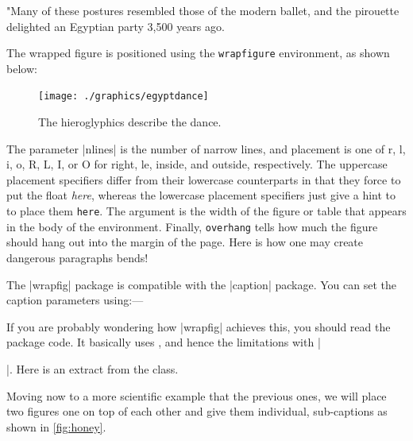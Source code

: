 \begin{dispListing}
"Many of these postures resembled those of the modern ballet, and the pirouette delighted an Egyptian party 3,500 years ago.
\medskip

The wrapped figure is positioned using the \texttt{wrapfigure} environment, as shown below:

\begin{teX}
\begin{figure}
   \texttt{[image: ./graphics/egyptdance]} 
   \caption{The hieroglyphics describe the dance.}
\end{figure}
\end{teX}

The parameter |nlines|  is the number of narrow lines, and placement is one of r, l, i, o, R, L, I, or
O for right, le, inside, and outside, respectively. The uppercase placement specifiers
differ from their lowercase counterparts in that they force \latex to put the float \emph{here},
whereas the lowercase placement specifiers just give a hint to \latex to place them
\texttt{here}. The  argument is the width of the figure or table that appears in the body
of the environment. Finally, \texttt{overhang} tells \latex how much the figure should hang out
into the margin of the page. Here is how one may create dangerous paragraphs bends!

The |wrapfig| package is compatible with the |caption| package. You can set the caption parameters using:---

\begin{teX}
\captionsetup[wrapfigure]{<options>}
\end{teX}

If you are probably wondering how |wrapfig| achieves this, you should read the package code. It basically uses , and hence the limitations with |\par|. Here is an extract from the class.

\begin{teX}
\def\WF@startfloating{%
 \WF@everypar\expandafter{\the\everypar}\let\everypar\WF@everypar
 \WF@@everypar{\ifvoid\WF@box\else\WF@floathand\fi \the\everypar
 \WF@wraphand
}}
\end{teX}

Moving now to a more scientific example that the previous ones, we will place two figures
one on top of each other and give them individual, sub-captions as shown in \ref{fig:honey}.
 

\end{dispListing}
